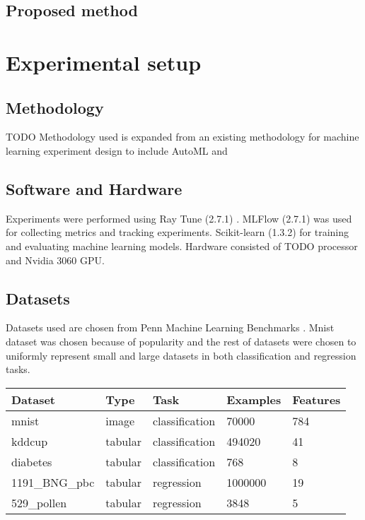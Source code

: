 \subsection{Proposed method}




\section{Experimental setup}

\subsection{Methodology}
TODO Methodology used is expanded from an existing methodology for machine learning experiment design \parencite{fernandez-lozanoMethodologyDesignExperiments2016} to include AutoML and

\subsection{Software and Hardware}

Experiments were performed using Ray Tune (2.7.1) \parencite{liawTuneResearchPlatform2018}. MLFlow (2.7.1) \parencite{chenDevelopmentsMLflowSystem2020} was used for collecting metrics and tracking experiments. Scikit-learn (1.3.2) \parencite{pedregosaScikitlearnMachineLearning2011} for training and evaluating machine learning models. Hardware consisted of TODO processor and Nvidia 3060 GPU.

\subsection{Datasets}

Datasets used are chosen from Penn Machine Learning Benchmarks \parencite{olsonPMLBLargeBenchmark2017}. Mnist dataset was chosen because of popularity and the rest of datasets were chosen to uniformly represent small and large datasets in both classification and regression tasks. 

\begin{table}[h]
    \label{table:datasets}
    \centering
    \begin{tabular}{lllll}
        \toprule
        Dataset        & Type    & Task           & Examples & Features \\
        \midrule
        mnist          & image   & classification & 70000    & 784      \\
        kddcup         & tabular & classification & 494020   & 41       \\
        diabetes       & tabular & classification & 768      & 8        \\
        1191\_BNG\_pbc & tabular & regression     & 1000000  & 19       \\
        529\_pollen    & tabular & regression     & 3848     & 5        \\
        \bottomrule
    \end{tabular}
\end{table}



